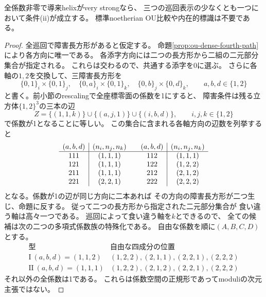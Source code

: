 \begin{theorem}[三巡回同時の格子障害の排除]
\label{thm:ou-dense-no-triple-grid-failure}
全係数非零で導来helixがvery strongなら、
三つの巡回表示の少なくとも一つにおいて条件(ii)が成立する。
標準noetherian OU比較や内在的標識は不要である。
\end{theorem}
\begin{proof}
全巡回で障害長方形があると仮定する。
命題\ref{prop:ou-dense-fourth-path}により各方向に唯一である。
各添字方向には二つの長方形から二組の二元部分集合が指定される。
これらは交わるので、共通する添字を$0$に選ぶ。
さらに各軸の$1,2$を交換して、三障害長方形を
\[
 \{0,1\}_i\times\{0,1\}_j,\quad
 \{0,a\}_i\times\{0,1\}_k,\quad
 \{0,b\}_j\times\{0,d\}_k,\qquad a,b,d\in\{1,2\}
\]
と書く。前小節のrescalingで全座標零面の係数を1にすると、
障害条件は残る立方体$\{1,2\}^3$の三本の辺
\[
 Z=\{(1,1,k)\}\cup\{(a,j,1)\}\cup\{(i,b,d)\},
 \qquad i,j,k\in\{1,2\}
\]
で係数が1となることに等しい。
この集合に含まれる各軸方向の辺数を列挙すると
\[
\begin{array}{c|c@{\qquad}c|c}
(a,b,d)&(n_i,n_j,n_k)&(a,b,d)&(n_i,n_j,n_k)\\ \hline
111&(1,1,1)&112&(1,1,1)\\
121&(1,1,1)&122&(1,2,2)\\
211&(1,1,1)&212&(2,1,2)\\
221&(2,2,1)&222&(2,2,2)
\end{array}
\]
となる。係数が1の辺が同じ方向に二本あれば
その方向の障害長方形が二つ生じ、命題に反する。
従って二つの長方形から指定された二元部分集合が
食い違う軸は高々一つである。
巡回によって食い違う軸を$k$とできるので、
全ての候補は次の二つの多項式係数族の特殊化である。
自由な係数を順に$(A,B,C,D)$とする。
\[
\begin{array}{c|c}
\text{型}&\text{自由な四成分の位置}\\ \hline
\mathrm{I}\ (a,b,d)=(1,1,2)&
 (1,2,2),(2,1,1),(2,2,1),(2,2,2)\\
\mathrm{II}\ (a,b,d)=(1,1,1)&
 (1,2,2),(2,1,2),(2,2,1),(2,2,2)
\end{array}
\]
それ以外の全係数は1である。
これらは係数空間の正規形であってmoduliの次元主張ではない。


\end{proof}
